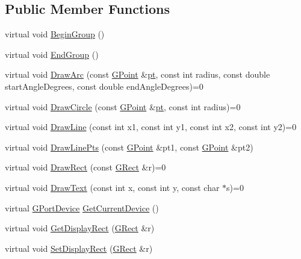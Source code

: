 \subsection*{Public Member Functions}
\begin{DoxyCompactItemize}
\item 
virtual void \mbox{\hyperlink{class_g_mac_port_a66b95b91c1a03a8200994ed2b7be4d67}{Begin\+Group}} ()
\item 
virtual void \mbox{\hyperlink{class_g_mac_port_a0c29e4ce61f7c281f5cc9c04930db4fc}{End\+Group}} ()
\item 
virtual void \mbox{\hyperlink{class_g_base_port_af9375a9f4cd1bc94ac70eb71c437835a}{Draw\+Arc}} (const \mbox{\hyperlink{class_g_point}{G\+Point}} \&\mbox{\hyperlink{rings_8cpp_af69bbacaaf68a115b351c5d1e29c3cc8}{pt}}, const int radius, const double start\+Angle\+Degrees, const double end\+Angle\+Degrees)=0
\item 
virtual void \mbox{\hyperlink{class_g_base_port_a7dbdd13c9a8f60537e7915a7991ab0f0}{Draw\+Circle}} (const \mbox{\hyperlink{class_g_point}{G\+Point}} \&\mbox{\hyperlink{rings_8cpp_af69bbacaaf68a115b351c5d1e29c3cc8}{pt}}, const int radius)=0
\item 
virtual void \mbox{\hyperlink{class_g_base_port_a9e19a5d97e629c3d19be31e1938504c1}{Draw\+Line}} (const int x1, const int y1, const int x2, const int y2)=0
\item 
virtual void \mbox{\hyperlink{class_g_base_port_ad176b1ff88c4c0a29d51869b13a288d2}{Draw\+Line\+Pts}} (const \mbox{\hyperlink{class_g_point}{G\+Point}} \&pt1, const \mbox{\hyperlink{class_g_point}{G\+Point}} \&pt2)
\item 
virtual void \mbox{\hyperlink{class_g_base_port_a40b25399150458e4f41d4ed6b2f31f16}{Draw\+Rect}} (const \mbox{\hyperlink{class_g_rect}{G\+Rect}} \&r)=0
\item 
virtual void \mbox{\hyperlink{class_g_base_port_a9b947d2575b05f303520fbbe7fd9e350}{Draw\+Text}} (const int x, const int y, const char $\ast$s)=0
\item 
virtual \mbox{\hyperlink{gport_8h_a595e501a3b83fde14c760260fbfb153f}{G\+Port\+Device}} \mbox{\hyperlink{class_g_base_port_aeca5105700149693465fb5dbc43c9bbc}{Get\+Current\+Device}} ()
\item 
virtual void \mbox{\hyperlink{class_g_base_port_a2d6dd3aa5ad82b26ed614e139c2f6b8f}{Get\+Display\+Rect}} (\mbox{\hyperlink{class_g_rect}{G\+Rect}} \&r)
\item 
virtual void \mbox{\hyperlink{class_g_base_port_a8ac5424f05a6b6b982e570aae0802087}{Set\+Display\+Rect}} (\mbox{\hyperlink{class_g_rect}{G\+Rect}} \&r)

\end{DoxyCompactItemize}
